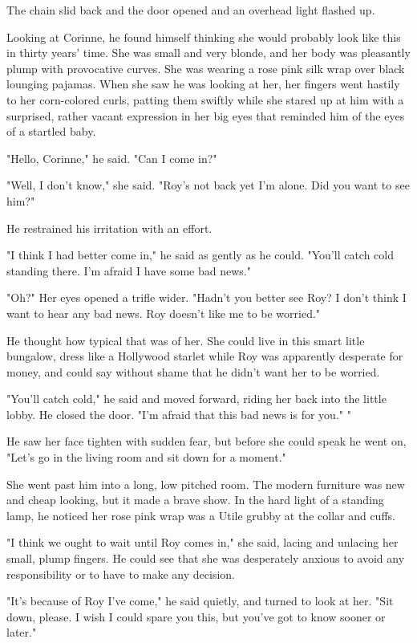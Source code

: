 \documentclass{novel}
\begin{document}
The chain slid back and the door opened and an overhead light flashed up.

Looking at Corinne, he found himself thinking she would probably look like this in thirty years' time. She was small and very blonde, and her body was pleasantly plump with provocative curves. She was wearing a rose pink silk wrap over black lounging pajamas. When she saw he was looking at her, her fingers went hastily to her corn-colored curls, patting them swiftly while she stared up at him with a surprised, rather vacant expression in her big eyes that reminded him of the eyes of a startled baby.

"Hello, Corinne," he said. "Can I come in?"

"Well, I don't know," she said. "Roy's not back yet I'm alone. Did you want to see him?"

He restrained his irritation with an effort.

"I think I had better come in," he said as gently as he could. "You'll catch cold standing there. I'm afraid I have some bad news."

"Oh?" Her eyes opened a trifle wider. "Hadn't you better see Roy? I don't think I want to hear any bad news. Roy doesn't like me to be worried."

He thought how typical that was of her. She could live in this smart litle bungalow, dress like a Hollywood starlet while Roy was apparently desperate for money, and could say without shame that he didn't want her to be worried.

"You'll catch cold," he said and moved forward, riding her back into the little lobby. He closed the door. "I'm afraid that this bad news is for you." "

He saw her face tighten with sudden fear, but before she could speak he went on, "Let's go in the living room and sit down for a moment."

She went past him into a long, low pitched room. The modern furniture was new and cheap looking, but it made a brave show. In the hard light of a standing lamp, he noticed her rose pink wrap was a Utile grubby at the collar and cuffs.

"I think we ought to wait until Roy comes in," she said, lacing and unlacing her small, plump fingers. He could see that she was desperately anxious to avoid any responsibility or to have to make any decision.

"It's because of Roy I've come," he said quietly, and turned to look at her. "Sit down, please. I wish I could spare you this, but you've got to know sooner or later."
\end{document}
